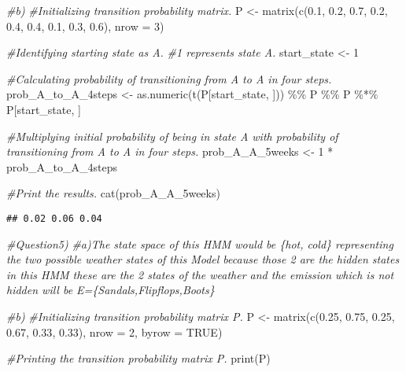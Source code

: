 \documentclass[
]{article}
\newenvironment{Shaded}{\begin{snugshade}}{\end{snugshade}}
\newcommand{\AttributeTok}[1]{\textcolor[rgb]{0.77,0.63,0.00}{#1}}
\newcommand{\CommentTok}[1]{\textcolor[rgb]{0.56,0.35,0.01}{\textit{#1}}}
\newcommand{\ConstantTok}[1]{\textcolor[rgb]{0.00,0.00,0.00}{#1}}
\newcommand{\DecValTok}[1]{\textcolor[rgb]{0.00,0.00,0.81}{#1}}
\newcommand{\FloatTok}[1]{\textcolor[rgb]{0.00,0.00,0.81}{#1}}
\newcommand{\FunctionTok}[1]{\textcolor[rgb]{0.00,0.00,0.00}{#1}}
\newcommand{\NormalTok}[1]{#1}
\newcommand{\OtherTok}[1]{\textcolor[rgb]{0.56,0.35,0.01}{#1}}
\newcommand{\SpecialCharTok}[1]{\textcolor[rgb]{0.00,0.00,0.00}{#1}}
\begin{document}
\begin{Shaded}
\begin{Highlighting}[]
\CommentTok{\#b)}
\CommentTok{\#Initializing transition probability matrix.}
\NormalTok{P }\OtherTok{\textless{}{-}} \FunctionTok{matrix}\NormalTok{(}\FunctionTok{c}\NormalTok{(}\FloatTok{0.1}\NormalTok{, }\FloatTok{0.2}\NormalTok{, }\FloatTok{0.7}\NormalTok{, }\FloatTok{0.2}\NormalTok{, }\FloatTok{0.4}\NormalTok{, }\FloatTok{0.4}\NormalTok{, }\FloatTok{0.1}\NormalTok{, }\FloatTok{0.3}\NormalTok{, }\FloatTok{0.6}\NormalTok{), }\AttributeTok{nrow =} \DecValTok{3}\NormalTok{)}

\CommentTok{\#Identifying starting state as A.}
\CommentTok{\#1 represents state A.}
\NormalTok{start\_state }\OtherTok{\textless{}{-}} \DecValTok{1}  

\CommentTok{\#Calculating probability of transitioning from A to A in four steps.}
\NormalTok{prob\_A\_to\_A\_4steps }\OtherTok{\textless{}{-}} \FunctionTok{as.numeric}\NormalTok{(}\FunctionTok{t}\NormalTok{(P[start\_state, ])) }\SpecialCharTok{\%\%}\NormalTok{ P }\SpecialCharTok{\%\%}\NormalTok{ P }\SpecialCharTok{\%*\%}\NormalTok{ P[start\_state, ]}

\CommentTok{\#Multiplying initial probability of being in state A with probability of transitioning from A to A in four steps.}
\NormalTok{prob\_A\_A\_5weeks }\OtherTok{\textless{}{-}} \DecValTok{1} \SpecialCharTok{*}\NormalTok{ prob\_A\_to\_A\_4steps}

\CommentTok{\#Print the results.}
\FunctionTok{cat}\NormalTok{(prob\_A\_A\_5weeks)}
\end{Highlighting}
\end{Shaded}

\begin{verbatim}
## 0.02 0.06 0.04
\end{verbatim}

\begin{Shaded}
\begin{Highlighting}[]
\CommentTok{\#Question5)}
\CommentTok{\#a)The state space of this HMM would be \{hot, cold\} representing the two possible weather states of this Model because those 2 are the hidden states in this HMM these are the 2 states of the weather and the emission which is not hidden will be E=\{Sandals,Flipflops,Boots\}}

\CommentTok{\#b)}
\CommentTok{\#Initializing transition probability matrix P.}
\NormalTok{P }\OtherTok{\textless{}{-}} \FunctionTok{matrix}\NormalTok{(}\FunctionTok{c}\NormalTok{(}\FloatTok{0.25}\NormalTok{, }\FloatTok{0.75}\NormalTok{, }\FloatTok{0.25}\NormalTok{, }\FloatTok{0.67}\NormalTok{, }\FloatTok{0.33}\NormalTok{, }\FloatTok{0.33}\NormalTok{), }\AttributeTok{nrow =} \DecValTok{2}\NormalTok{, }\AttributeTok{byrow =} \ConstantTok{TRUE}\NormalTok{)}

\CommentTok{\#Printing the transition probability matrix P.}
\FunctionTok{print}\NormalTok{(P)}
\end{Highlighting}
\end{Shaded}
\end{document}
